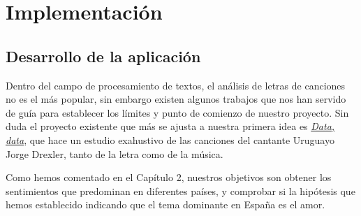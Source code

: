 \chapter{Implementaci\'on}
\label{cap:implementacion}

\section{Desarrollo de la aplicación}
Dentro del campo de procesamiento de textos, el análisis de letras de canciones no es el más popular, sin embargo existen algunos trabajos que nos han servido de guía para establecer los límites y punto de comienzo de nuestro proyecto. Sin duda el proyecto existente que más se ajusta a nuestra primera idea es \href{https://medium.com/@alexing/data-data-b82201ec1cf4}{\textit{Data, data}}, que hace un estudio exahustivo de las canciones del cantante Uruguayo Jorge Drexler, tanto de la letra como de la música.

Como hemos comentado en el Capítulo 2, nuestros objetivos son obtener los sentimientos que predominan en diferentes países, y comprobar si la hipótesis que hemos establecido indicando que el tema dominante en España es el amor.

